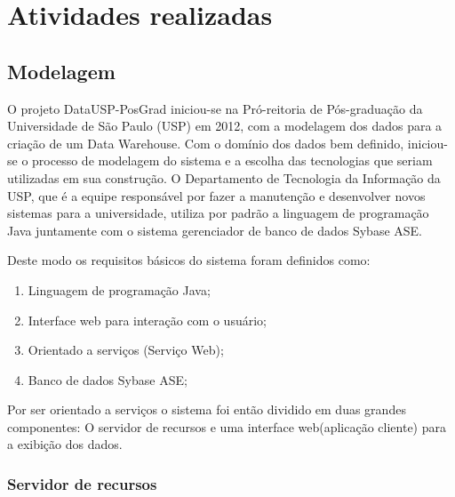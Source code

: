 \chapter{Atividades realizadas}
\label{ch:3}

\section{Modelagem}
\label{sec:mod}

O projeto DataUSP-PosGrad iniciou-se na Pró-reitoria de Pós-graduação da Universidade de São Paulo (USP) em 2012, com a modelagem dos dados para a criação de um Data Warehouse. Com o domínio dos dados bem definido, iniciou-se o processo de modelagem do sistema e a escolha das tecnologias que seriam utilizadas em sua construção. O Departamento de Tecnologia da Informação da USP, que é a equipe responsável por fazer a manutenção e desenvolver novos sistemas para a universidade, utiliza por padrão a linguagem de programação Java juntamente com o sistema gerenciador de banco de dados Sybase ASE. 
\par
Deste modo os requisitos básicos do sistema foram definidos como:

\begin{enumerate}

\item Linguagem de programação Java;
\item Interface web para interação com o usuário;
\item Orientado a serviços (Serviço Web);
\item Banco de dados Sybase ASE;

\end{enumerate}

Por ser orientado a serviços o sistema foi então dividido em duas grandes componentes: O servidor de recursos e uma interface web(aplicação cliente) para a exibição dos dados.

\subsection{Servidor de recursos}
\label{sub:server}

